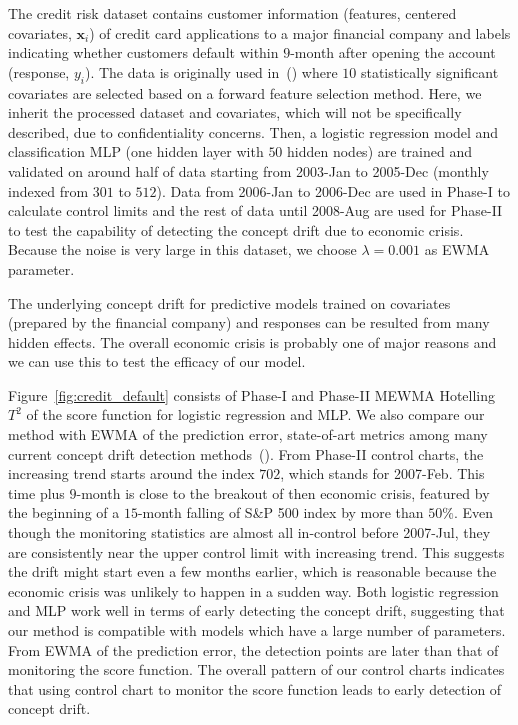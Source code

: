\documentclass[twoside,11pt]{article}
\begin{document}
The credit risk dataset contains customer information (features, centered covariates,  $\bm {x}_i$) of credit card applications to a major financial company and labels indicating whether customers default within $9$-month after opening the account (response, $y_i$). The data is originally used in~(\cite{im2012time}) where $10$ statistically significant covariates are selected based on a forward feature selection method. Here, we inherit the processed dataset and covariates, which will not be specifically described, due to confidentiality concerns. Then, a logistic regression model and classification MLP (one hidden layer with $50$ hidden nodes) are trained and validated on around half of data starting from 2003-Jan to 2005-Dec (monthly indexed from $301$ to $512$). Data from 2006-Jan to 2006-Dec are used in Phase-I to calculate control limits and the rest of data until 2008-Aug are used for Phase-II to test the capability of detecting the concept drift due to economic crisis. Because the noise is very large in this dataset, we choose $ \lambda = 0.001$ as EWMA parameter.

The underlying concept drift for predictive models trained on covariates (prepared by the financial company) and responses can be resulted from many hidden effects. The overall economic crisis is probably one of major reasons and we can use this to test the efficacy of our model. 

Figure~\ref{fig:credit_default} consists of Phase-I and Phase-II MEWMA Hotelling $T^2$ of the score function for logistic regression and MLP. We also compare our method with EWMA of the prediction error, state-of-art metrics among many current concept drift detection methods~(\cite{barros2018large}). From Phase-II control charts, the increasing trend starts around the index $702$, which stands for 2007-Feb. This time plus $9$-month is close to the breakout of then economic crisis, featured by the beginning of a $15$-month falling of S\&P 500 index by more than $50\%$. Even though the monitoring statistics are almost all in-control before 2007-Jul, they are consistently near the upper control limit with increasing trend. This suggests the drift might start even a few months earlier, which is reasonable because the economic crisis was unlikely to happen in a sudden way. Both logistic regression and MLP work well in terms of early detecting the concept drift, suggesting that our method is compatible with models which have a large number of parameters. From EWMA of the prediction error, the detection points are later than that of monitoring the score function. The overall pattern of our control charts indicates that using control chart to monitor the score function leads to early detection of concept drift. 
\end{document}

